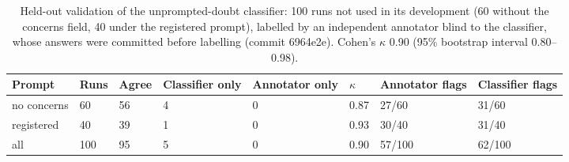 \begin{table}[h]
\centering\small
\caption{Held-out validation of the unprompted-doubt classifier: 100 runs not used in its development (60 without the concerns field, 40 under the registered prompt), labelled by an independent annotator blind to the classifier, whose answers were committed before labelling (commit 6964e2e). Cohen's $\kappa$ 0.90 (95\% bootstrap interval 0.80--0.98).}
\begin{tabular}{llllllll}
\toprule
Prompt & Runs & Agree & Classifier only & Annotator only & $\kappa$ & Annotator flags & Classifier flags \\
\midrule
no concerns & 60 & 56 & 4 & 0 & 0.87 & 27/60 & 31/60 \\
registered & 40 & 39 & 1 & 0 & 0.93 & 30/40 & 31/40 \\
all & 100 & 95 & 5 & 0 & 0.90 & 57/100 & 62/100 \\
\bottomrule
\end{tabular}
\end{table}
